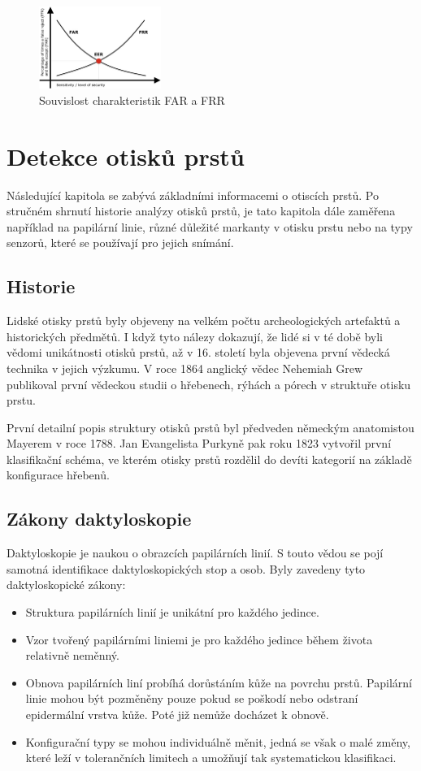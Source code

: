 \begin{figure}[!htbp]
    \centering
    \includegraphics[width=150px]{obrazky-figures/frrfar.jpeg}
    \caption{Souvislost charakteristik FAR a FRR \cite{FARFRR}}
\end{figure}

\chapter{Detekce otisků prstů}
Následující kapitola se zabývá základními informacemi o otiscích prstů. Po stručném shrnutí historie analýzy otisků prstů, je tato kapitola dále zaměřena například na papilární linie, různé důležité markanty v otisku prstu nebo na typy senzorů, které se používají pro jejich snímání.
\section{Historie}
Lidské otisky prstů byly objeveny na velkém počtu archeologických artefaktů a historických předmětů. I když tyto nálezy dokazují, že lidé si v té době byli vědomi unikátnosti otisků prstů, až v 16. století byla objevena první vědecká technika v jejich výzkumu. V roce 1864 anglický vědec Nehemiah Grew publikoval první vědeckou studii o hřebenech, rýhách a pórech v struktuře otisku prstu.

První detailní popis struktury otisků prstů byl předveden německým anatomistou Mayerem v roce 1788. Jan Evangelista Purkyně pak roku 1823 vytvořil první klasifikační schéma, ve kterém otisky prstů rozdělil do devíti kategorií na základě konfigurace hřebenů. \cite{Maltoni2009}

\section{Zákony daktyloskopie}
Daktyloskopie je naukou o obrazcích papilárních linií. S touto vědou se pojí samotná identifikace daktyloskopických stop a osob. \cite{PolicieDaktyloskopie} Byly zavedeny tyto daktyloskopické zákony: \cite{Drahansky}
\begin{itemize}
    \item Struktura papilárních linií je unikátní pro každého jedince.
    \item Vzor tvořený papilárními liniemi je pro každého jedince během života relativně neměnný.
    \item Obnova papilárních liní probíhá dorůstáním kůže na povrchu prstů. Papilární linie mohou být pozměněny pouze pokud se poškodí nebo odstraní epidermální vrstva kůže. Poté již nemůže docházet k obnově.
    \item Konfigurační typy se mohou individuálně měnit, jedná se však o malé změny, které leží v tolerančních limitech a umožňují tak systematickou klasifikaci.
\end{itemize}

